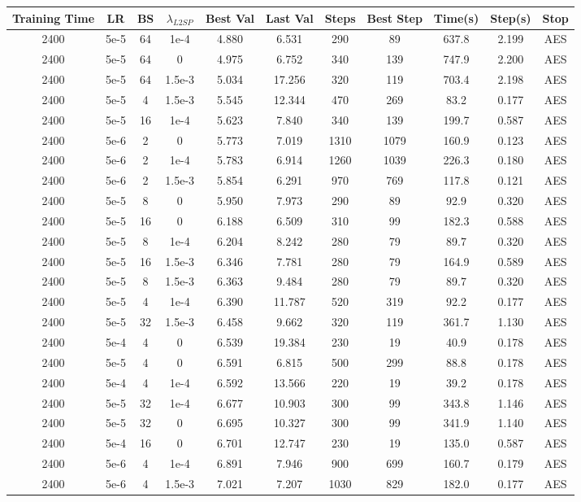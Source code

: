 \begin{table}[p]
\centering
\scriptsize
\renewcommand{\arraystretch}{0.9}
\begin{adjustbox}{max width=\textwidth,max totalheight=\textheight}
\begin{tabular}{ccccccccccc}
\hline
Training Time & LR & BS & $\lambda_{L2SP}$ & Best Val & Last Val & Steps & Best Step & Time(s) & Step(s) & Stop\\
\hline
2400&5e-5&64&1e-4&4.880&6.531&290&89&637.8&2.199&AES\\
2400&5e-5&64&0&4.975&6.752&340&139&747.9&2.200&AES\\
2400&5e-5&64&1.5e-3&5.034&17.256&320&119&703.4&2.198&AES\\
2400&5e-5&4&1.5e-3&5.545&12.344&470&269&83.2&0.177&AES\\
2400&5e-5&16&1e-4&5.623&7.840&340&139&199.7&0.587&AES\\
2400&5e-6&2&0&5.773&7.019&1310&1079&160.9&0.123&AES\\
2400&5e-6&2&1e-4&5.783&6.914&1260&1039&226.3&0.180&AES\\
2400&5e-6&2&1.5e-3&5.854&6.291&970&769&117.8&0.121&AES\\
2400&5e-5&8&0&5.950&7.973&290&89&92.9&0.320&AES\\
2400&5e-5&16&0&6.188&6.509&310&99&182.3&0.588&AES\\
2400&5e-5&8&1e-4&6.204&8.242&280&79&89.7&0.320&AES\\
2400&5e-5&16&1.5e-3&6.346&7.781&280&79&164.9&0.589&AES\\
2400&5e-5&8&1.5e-3&6.363&9.484&280&79&89.7&0.320&AES\\
2400&5e-5&4&1e-4&6.390&11.787&520&319&92.2&0.177&AES\\
2400&5e-5&32&1.5e-3&6.458&9.662&320&119&361.7&1.130&AES\\
2400&5e-4&4&0&6.539&19.384&230&19&40.9&0.178&AES\\
2400&5e-5&4&0&6.591&6.815&500&299&88.8&0.178&AES\\
2400&5e-4&4&1e-4&6.592&13.566&220&19&39.2&0.178&AES\\
2400&5e-5&32&1e-4&6.677&10.903&300&99&343.8&1.146&AES\\
2400&5e-5&32&0&6.695&10.327&300&99&341.9&1.140&AES\\
2400&5e-4&16&0&6.701&12.747&230&19&135.0&0.587&AES\\
2400&5e-6&4&1e-4&6.891&7.946&900&699&160.7&0.179&AES\\
2400&5e-6&4&1.5e-3&7.021&7.207&1030&829&182.0&0.177&AES\\

\end{tabular}
\end{adjustbox}
\end{table}
